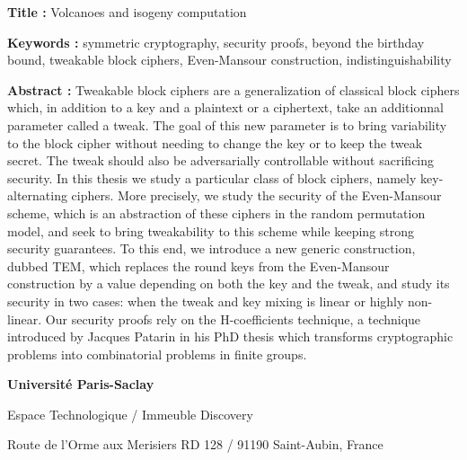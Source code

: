 \documentclass[a4paper, titlepage, 12pt]{book}
\newcommand{\titreeng}{Volcanoes and isogeny computation}
\begin{document}

\begin{breakbox}

\noindent\textbf{Title : }\titreeng

\vspace{2ex}

\noindent\textbf{Keywords : }symmetric cryptography, security proofs, beyond the birthday bound, 
tweakable block ciphers, Even-Mansour construction, indistinguishability

\begin{multicols}{2}
\noindent\textbf{Abstract : }
Tweakable block ciphers are a generalization of classical block ciphers which, in addition to a key and
a plaintext or a ciphertext, take an additionnal parameter called a tweak. The goal of this new parameter
is to bring variability to the block cipher without needing to change the key or to keep the tweak secret.
The tweak should also be adversarially controllable without sacrificing security.
In this thesis we study a particular class of block ciphers, namely key-alternating ciphers. More precisely,
we study the security of the Even-Mansour scheme, which is an abstraction of these ciphers in the random permutation
model, and seek to bring tweakability to this scheme while keeping strong security guarantees. To this end, we introduce
a new generic construction, dubbed TEM, which replaces the round keys from the Even-Mansour construction by a value
depending on both the key and the tweak, and study its security in two cases: when the tweak and key mixing is
linear or highly non-linear. Our security proofs rely on the H-coefficients technique, a technique introduced by
Jacques Patarin in his PhD thesis which transforms cryptographic problems into combinatorial problems in finite groups.
\end{multicols}
\end{breakbox}


{\tiny
\noindent
\textbf{Université Paris-Saclay}

\noindent
Espace Technologique / Immeuble Discovery

\noindent
Route de l’Orme aux Merisiers RD 128 / 91190 Saint-Aubin, France 

}
\end{document}
